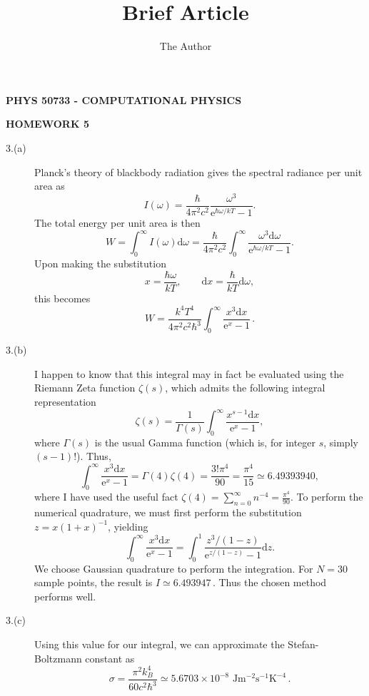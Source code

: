 \documentclass[11pt, oneside]{article}   	%
\title{Brief Article}
\author{The Author}
\begin{document}
\begin{center}{\bf PHYS 50733 - COMPUTATIONAL PHYSICS}\end{center}
\begin{center}{\bf HOMEWORK 5 }\end{center}
\begin{description} 
\item[3.(a)] Planck's theory of blackbody radiation gives the spectral radiance per unit area as \[I(\omega)=\frac{\hbar}{4\pi^2c^2}\frac{\omega^3}{\mathrm{e}^{\hbar\omega/kT}-1}.\] The total energy per unit area is then \[W=\int_0^\infty I(\omega)\mathrm{d}\omega=\frac{\hbar}{4\pi^2c^2}\int_0^\infty \frac{\omega^3\mathrm{d}\omega}{\mathrm{e}^{\hbar\omega/kT}-1}.\] Upon making the substitution \[x=\frac{\hbar\omega}{kT},\qquad\mathrm{d}x=\frac{\hbar}{kT}\mathrm{d}\omega,\] this becomes 
\[\boxed{W=\frac{k^4T^4}{4\pi^2c^2\hbar^3}\int_0^\infty \frac{x^3\mathrm{d}x}{\mathrm{e}^x-1}}\,.\]
\item[3.(b)] I happen to know that this integral may in fact be evaluated using the Riemann Zeta function $\zeta(s)$, which admits the following integral representation \[\zeta(s)=\frac{1}{\Gamma(s)}\int_0^\infty\frac{x^{s-1}\mathrm{d}x}{\mathrm{e}^x-1},\] where $\Gamma(s)$ is the usual Gamma function (which is, for integer $s$, simply $(s-1)!$). Thus, \[\int_0^\infty\frac{x^3\mathrm{d}x}{\mathrm{e}^x-1}=\Gamma(4)\zeta(4)=\frac{3!\pi^4}{90}=\frac{\pi^4}{15}\simeq6.49393940,\] where I have used the useful fact $\zeta(4)=\sum_{n=0}^\infty n^{-4}=\frac{\pi^4}{90}$. To perform the numerical quadrature, we must first perform the substitution $z=x(1+x)^{-1}$, yielding \[\int_0^\infty \frac{x^3\mathrm{d}x}{\mathrm{e}^x-1}=\int_0^1\frac{z^3/(1-z)}{\mathrm{e}^{z/(1-z)}-1}\mathrm{d}z.\] We choose Gaussian quadrature to perform the integration. For $N=30$ sample points, the result is $\boxed{I\simeq6.493947}\,$. Thus the chosen method performs well.
\item[3.(c)] Using this value for our integral, we can approximate the Stefan-Boltzmann constant as \[\boxed{\sigma=\frac{\pi^2k_B^4}{60c^2\hbar^3}\simeq5.6703\times10^{-8}\,\,\mathrm{J}\mathrm{m}^{-2}\mathrm{s}^{-1}\mathrm{K}^{-4}}\,.\]
\end{description}
\end{document}
